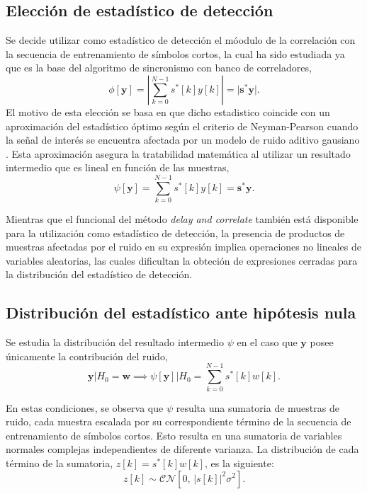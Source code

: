 \subsection{Elección de estadístico de detección}
\label{Ss:hipotesis-estadistico}

\color{Green}
Se decide utilizar como estadístico de detección el móodulo de la correlación con la secuencia de entrenamiento de símbolos cortos, la cual ha sido estudiada ya que es la base del algoritmo de sincronismo con banco de correladores,
\begin{equation}
    \phi[\mathbf{y}] = \left\lvert\sum_{k=0}^{N-1} s^\ast[k]y[k]\right\rvert = \lvert \mathbf{s}^\ast\mathbf{y}\rvert.
\end{equation}
El motivo de esta elección se basa en que dicho estadistico coincide con un aproximación del estadístico óptimo según el criterio de Neyman-Pearson cuando la señal de interés se encuentra afectada por un modelo de ruido aditivo gausiano \cite{richards}. Esta aproximación asegura la tratabilidad matemática al utilizar un resultado intermedio que es lineal en función de las muestras,
\begin{equation}
    \psi[\mathbf{y}] = \sum_{k=0}^{N-1} s^\ast[k]y[k] = \mathbf{s}^\ast\mathbf{y}.
\end{equation}

Mientras que el funcional del método \textit{delay and correlate} también está disponible para la utilización como estadístico de detección, la presencia de productos de muestras afectadas por el ruido en su expresión implica operaciones no lineales de variables aleatorias, las cuales dificultan la obteción de expresiones cerradas para la distribución del estadístico de detección.
\color{black}

\subsection{Distribución del estadístico ante hipótesis nula}

Se estudia la distribución del \color{Green}resultado intermedio \color{black} $\psi$ en el caso que $\mathbf{y}$ posee únicamente la contribución del ruido,
\begin{equation}\label{eq:psi-ante-h0}
    \mathbf{y} | H_0 = \mathbf{w} \implies \psi[\mathbf{y}] | H_0= \sum_{k = 0}^{N-1} s^\ast[k]w[k].
\end{equation}

En estas condiciones, se observa que $\psi$ resulta una sumatoria de muestras de ruido, cada muestra escalada por su correspondiente término de la secuencia de entrenamiento de símbolos cortos. Esto resulta en una sumatoria de variables normales complejas independientes de diferente varianza. La distribución de cada término de la sumatoria, $z[k] = s^\ast[k]w[k]$, es la siguiente:
\begin{equation}
    z[k] \sim \mathcal{CN}[0,\, \lvert s[k]\rvert^2\sigma^2].
\end{equation}

